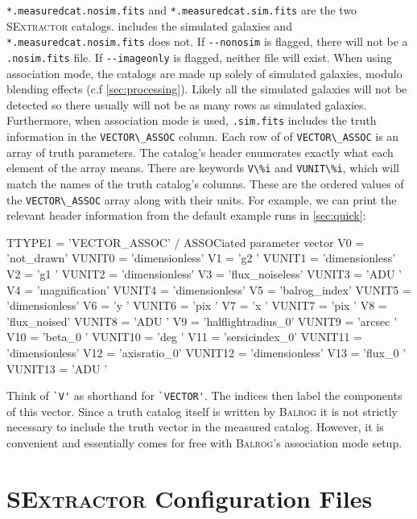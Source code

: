 \documentclass[11pt]{book}
\newcommand{\codett}[1]{\lstinline{#1}}
\newcommand{\balrog}{\textsc{Balrog}}
\newcommand{\sex}{\textsc{SExtractor}}
\newcommand{\opt}[1]{\codett{--#1}}
\begin{document}
\codett{*.measuredcat.nosim.fits} and \codett{*.measuredcat.sim.fits} are the two \sex{} catalogs.
 includes the simulated galaxies and \codett{*.measuredcat.nosim.fits} does not.
If \opt{nonosim} is flagged, there will not be a \codett{.nosim.fits} file.
If \opt{imageonly} is flagged, neither file will exist.
When using association mode, the catalogs are made up solely of simulated galaxies, 
modulo blending effects (c.f \autoref{sec:processing}). Likely all the simulated galaxies will not
be detected so there usually will not be as many rows as simulated galaxies.
Furthermore, when  association mode is used, \codett{.sim.fits} includes the truth information
in the \codett{VECTOR\_ASSOC} column. Each row of of \codett{VECTOR\_ASSOC} is an array of truth parameters.
The catalog's header enumerates exactly what each element of the array means.
There are keywords \codett{V\%i} and \codett{VUNIT\%i}, which will match the names of the truth catalog's columns.
These are the ordered values of the \codett{VECTOR\_ASSOC} array along with their units.
For example, we can print the relevant header information from the default example runs in \autoref{sec:quick}:
\begin{cmdline}
TTYPE1  = 'VECTOR_ASSOC'       / ASSOCiated parameter vector
V0      = 'not_drawn'
VUNIT0  = 'dimensionless'
V1      = 'g2      '
VUNIT1  = 'dimensionless'
V2      = 'g1      '
VUNIT2  = 'dimensionless'
V3      = 'flux_noiseless'
VUNIT3  = 'ADU     '
V4      = 'magnification'
VUNIT4  = 'dimensionless'
V5      = 'balrog_index'
VUNIT5  = 'dimensionless'
V6      = 'y       '
VUNIT6  = 'pix     '
V7      = 'x       '
VUNIT7  = 'pix     '
V8      = 'flux_noised'
VUNIT8  = 'ADU     '
V9      = 'halflightradius_0'
VUNIT9  = 'arcsec  '
V10     = 'beta_0  '
VUNIT10 = 'deg     '
V11     = 'sersicindex_0'
VUNIT11 = 'dimensionless'
V12     = 'axisratio_0'
VUNIT12 = 'dimensionless'
V13     = 'flux_0  '
VUNIT13 = 'ADU     '
\end{cmdline}
Think of \codett{`V'} as shorthand for \codett{`VECTOR'}. The indices then label the components of this vector.
Since a truth catalog itself is written by \balrog{} it is not strictly necessary to include the truth
vector in the measured catalog. However, it is convenient and essentially comes for free with \balrog{}'s
association mode setup. 


\section{\sex{} Configuration Files}
\label{sec:sexfiles}
\end{document}
